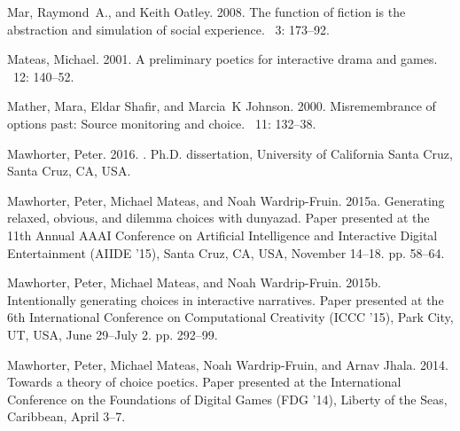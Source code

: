 \documentclass[arts,article,accept,moreauthors,pdftex,10pt,a4paper]{Definitions/mdpi}
\begin{document}
\begin{thebibliography}{999}
Mar, Raymond~A., and Keith Oatley. 2008.
\newblock The function of fiction is the abstraction and simulation of social
  experience.
~{3\/}: 173--92.

Mateas, Michael. 2001.
\newblock A preliminary poetics for interactive drama and games.
~{12\/}: 140--52.

Mather, Mara, Eldar Shafir, and Marcia~K Johnson. 2000.
\newblock Misremembrance of options past: {Source} monitoring and choice.
~{11\/}: 132--38.

Mawhorter, Peter. 2016.
.
\newblock Ph.D. dissertation, University of California Santa Cruz, Santa Cruz, CA, USA.

Mawhorter, Peter, Michael Mateas, and Noah Wardrip-Fruin. 2015a.
\newblock Generating relaxed, obvious, and dilemma choices with dunyazad.
\newblock  Paper presented at the 11th Annual AAAI Conference on Artificial
  Intelligence and Interactive Digital Entertainment (AIIDE '15), Santa Cruz, CA, USA, November 14--18. pp. 58--64.


Mawhorter, Peter, Michael Mateas, and Noah Wardrip-Fruin. 2015b.
\newblock Intentionally generating choices in interactive narratives.
\newblock Paper presented at the 6th International Conference on
  Computational Creativity (ICCC '15), Park City, UT, USA, June 29--July 2. pp. 292--99.


Mawhorter, Peter, Michael Mateas, Noah Wardrip-Fruin, and Arnav Jhala. 2014.
\newblock Towards a theory of choice poetics.
\newblock Paper presented at the International Conference on the Foundations of Digital
  Games (FDG '14), Liberty of the Seas, Caribbean, April 3--7.


\end{thebibliography}
\end{document}
